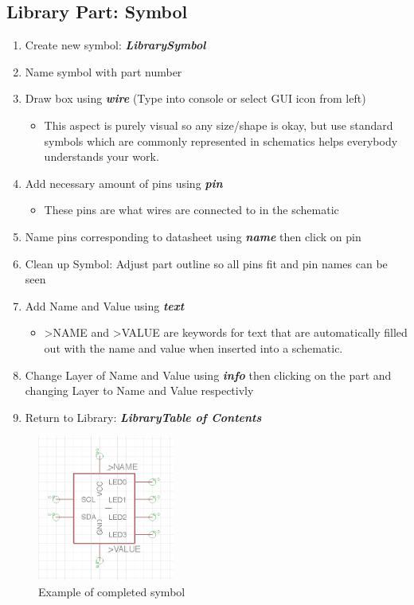 \documentclass{article}
\begin{document}
\subsection{Library Part: Symbol}
\begin{enumerate}
    \item Create new symbol: \textit{\textbf{Library\textrightarrow Symbol}}
    \item Name symbol with part number
    \item Draw box using \textit{\textbf{wire}} (Type into console or select GUI icon from left)
    \begin{itemize}
        \item This aspect is purely visual so any size/shape is okay, but use standard symbols which are commonly represented in schematics helps everybody understands your work.
    \end{itemize}
    \item Add necessary amount of pins using \textit{\textbf{pin}}
    \begin{itemize}
        \item These pins are what wires are connected to in the schematic
    \end{itemize}
    \item Name pins corresponding to datasheet using \textit{\textbf{name}} then click on pin
    \item Clean up Symbol: Adjust part outline so all pins fit and pin names can be seen
    \item Add Name and Value using \textit{\textbf{text}}
    \begin{itemize}
        \item \textgreater NAME and  \textgreater VALUE are keywords for text that are automatically filled out with the name and value when inserted into a schematic.
    \end{itemize}
    \item Change Layer of Name and Value using \textit{\textbf{info}} then clicking on the part and changing Layer to Name and Value respectivly
    \item Return to Library: \textit{\textbf{Library\textrightarrow Table of Contents}}
\end{enumerate}

\begin{figure}[!h]
    \center
    \includegraphics[width=0.4\textwidth,height=0.4\textheight,keepaspectratio]{symbol}
    \caption {Example of completed symbol}
    \label{img:symbol}
\end{figure}
\end{document}
